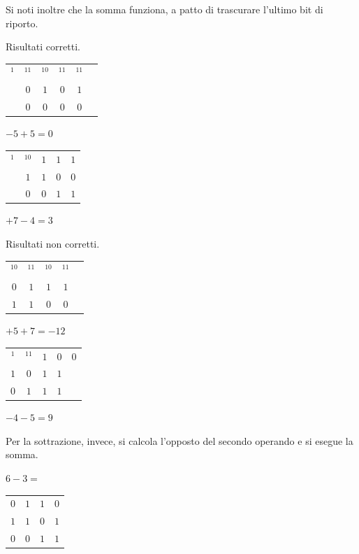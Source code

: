 Si noti inoltre che la somma funziona, a patto di trascurare l’ultimo bit di riporto.
\begin{center}
    Risultati corretti.\\
    \begin{tabular}{c c c c c c }
         $^1$&$^11$&$^10$&$^11$&$^11$\\
         &$0$&$1$&$0$&$1$\\\hline
         &$0$&$0$&$0$&$0$
    \end{tabular}\hspace{0,5cm}$-5 +5 = 0$\hspace{1cm}
    \begin{tabular}{c c c c c}
         $^1$&$^10$&$1$&$1$&$1$\\
         &$1$&$1$&$0$&$0$\\\hline
         &$0$&$0$&$1$&$1$
    \end{tabular}\hspace{0,5cm}$+7 -4 = 3$
    
    Risultati non corretti.\\
    \begin{tabular}{c c c c c}
         $^10$&$^11$&$^10$&$^11$\\
         $0$&$1$&$1$&$1$\\\hline
         $1$&$1$&$0$&$0$
    \end{tabular}\hspace{0,5cm}$+5 +7 = -12$\hspace{1cm}
    \begin{tabular}{c c c c c}
         $^1$&$^11$&$1$&$0$&$0$\\
         $1$&$0$&$1$&$1$\\\hline
         $0$&$1$&$1$&$1$
    \end{tabular}\hspace{0,5cm}$-4 -5 = 9$
\end{center}

Per la sottrazione, invece, si calcola l'opposto del secondo operando e si esegue la somma.
\begin{center}
    $6 - 3 = $\hspace{0,5cm}
    \begin{tabular}{c c c c}
    \centering
         $0$&$1$&$1$&$0$\\
         $1$&$1$&$0$&$1$\\\hline
         $0$&$0$&$1$&$1$
    \end{tabular}
\end{center}

